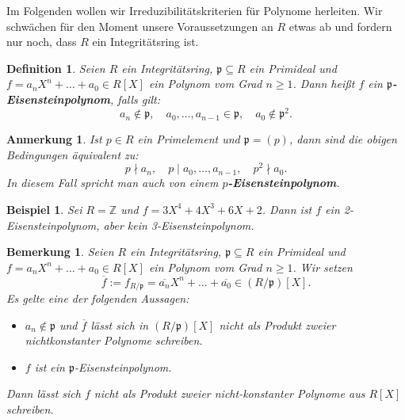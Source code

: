 \documentclass[a4paper, twoside, 11pt, ngerman]{report}
\newcommand{\ZZ}{\mathds Z}
\theoremstyle{definistyle}
\newtheorem{defini}[satz]{Definition}
\newtheorem{bem}[satz]{Bemerkung}
\newtheorem{anm}[satz]{Anmerkung}
\newtheorem{bsp}[satz]{Beispiel}
\theoremstyle{remark}
\newcommand{\defn}[1]{\textit{\bfseries #1}}
\begin{document}
Im Folgenden wollen wir Irreduzibilitätskriterien für Polynome herleiten.
Wir schwächen für den Moment unsere Voraussetzungen an $R$ etwas ab und fordern nur noch, dass $R$ ein Integritätsring ist.

\begin{defini}\label{bem:eisenstein_polynom}
Seien $R$ ein Integritätsring, $\mathfrak{p} \subseteq R$ ein Primideal und $f = a_n X^n + \dots + a_0 \in R[X]$ ein Polynom vom Grad $n\geq 1$. Dann heißt $f$ ein \defn{$\mathfrak{p}$-Eisensteinpolynom}, falls gilt:
\[
a_n \notin \mathfrak{p}, \quad a_0, \dots, a_{n-1} \in \mathfrak{p}, \quad a_0 \notin \mathfrak{p}^2.
\]
\end{defini}

\begin{anm}\label{anm:p_eisenstein_polynom}
Ist $p \in R$ ein Primelement und $\mathfrak{p} = (p)$, dann sind die obigen Bedingungen äquivalent zu:
\[
p \nmid a_n, \quad p \mid a_0, \dots, a_{n-1}, \quad p^2 \nmid a_0.
\]
In diesem Fall spricht man auch von einem \defn{$p$-Eisensteinpolynom}.
\end{anm}


\begin{bsp}\label{bsp:eisenstein_2_3}
Sei $R = \ZZ$ und $f = 3X^4 + 4X^3 + 6X + 2$. Dann ist $f$ ein 2-Eisensteinpolynom, aber kein 3-Eisensteinpolynom.
\end{bsp}

\begin{bem}\label{bem:eisenstein_kriterium}
Seien $R$ ein Integritätsring, $\mathfrak{p} \subseteq R$ ein Primideal und $f = a_n X^n + \dots + a_0 \in R[X]$ ein Polynom vom Grad $n\geq1$. Wir setzen
\[
\overline{f} := f_{R/\mathfrak{p}}=\overline{a_n}X^n+\ldots+\overline{a_0} \in (R / \mathfrak{p})[X].
\]
Es gelte eine der folgenden Aussagen:
\begin{itemize}
    \item[(I)] $a_n \notin \mathfrak{p}$ und $\overline{f}$ lässt sich in $(R / \mathfrak{p})[X]$ nicht als Produkt zweier nichtkonstanter Polynome schreiben.
    \item[(II)] $f$ ist ein $\mathfrak{p}$-Eisensteinpolynom.
\end{itemize}
Dann lässt sich $f$ nicht als Produkt zweier nicht-konstanter Polynome aus $R[X]$ schreiben.
\end{bem}
\end{document}
